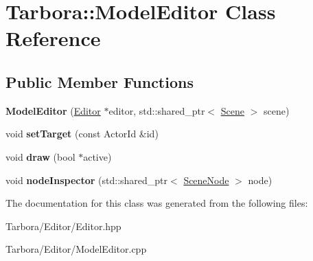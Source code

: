 \hypertarget{classTarbora_1_1ModelEditor}{}\section{Tarbora\+:\+:Model\+Editor Class Reference}
\label{classTarbora_1_1ModelEditor}
\subsection*{Public Member Functions}
\begin{DoxyCompactItemize}
\item 
\mbox{\label{classTarbora_1_1ModelEditor_a0bad3df9d7e52ad056a503c72fb7ccf3}} 
{\bfseries Model\+Editor} (\hyperlink{classTarbora_1_1Editor}{Editor} $\ast$editor, std\+::shared\+\_\+ptr$<$ \hyperlink{classTarbora_1_1Scene}{Scene} $>$ scene)
\item 
\mbox{\label{classTarbora_1_1ModelEditor_aad0f5e1ce9fc759ddd2b2fb203828537}} 
void {\bfseries set\+Target} (const Actor\+Id \&id)
\item 
\mbox{\label{classTarbora_1_1ModelEditor_af2ce4ce4d0e5630355e811bd9d14e665}} 
void {\bfseries draw} (bool $\ast$active)
\item 
\mbox{\label{classTarbora_1_1ModelEditor_a535675c639598625c9fac9b7b7a7927d}} 
void {\bfseries node\+Inspector} (std\+::shared\+\_\+ptr$<$ \hyperlink{classTarbora_1_1SceneNode}{Scene\+Node} $>$ node)
\end{DoxyCompactItemize}


The documentation for this class was generated from the following files\+:\begin{DoxyCompactItemize}
\item 
Tarbora/\+Editor/Editor.\+hpp\item 
Tarbora/\+Editor/Model\+Editor.\+cpp\end{DoxyCompactItemize}
